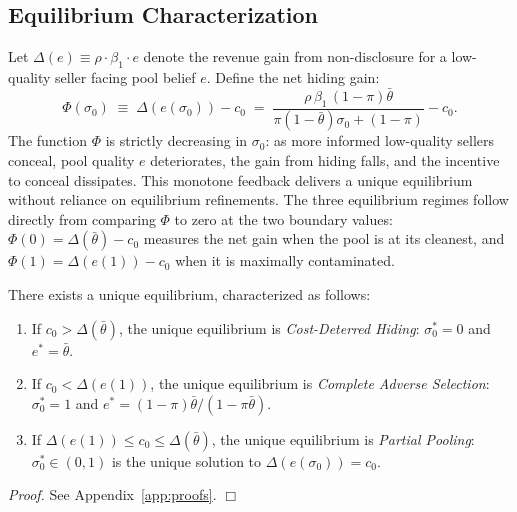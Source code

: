 \documentclass[10pt,letterpaper]{bp-template-concise}
\begin{document}
\subsection{Equilibrium Characterization}

Let $\Delta(e)\equiv\rho\cdot\beta_1\cdot e$ denote the revenue gain from non-disclosure for a low-quality seller facing pool belief $e$. Define the net hiding gain:
\begin{equation}
    \Phi(\sigma_0) \;\equiv\; \Delta\!\left(e(\sigma_0)\right) - c_0 \;=\; \frac{\rho\,\beta_1\,(1-\pi)\bar{\theta}}{\pi(1-\bar{\theta})\sigma_0 + (1-\pi)} - c_0.
    \label{eq:Phi}
\end{equation}
The function $\Phi$ is strictly decreasing in $\sigma_0$: as more informed low-quality sellers conceal, pool quality $e$ deteriorates, the gain from hiding falls, and the incentive to conceal dissipates. This monotone feedback delivers a unique equilibrium without reliance on equilibrium refinements. The three equilibrium regimes follow directly from comparing $\Phi$ to zero at the two boundary values: $\Phi(0)=\Delta(\bar{\theta})-c_0$ measures the net gain when the pool is at its cleanest, and $\Phi(1)=\Delta(e(1))-c_0$ when it is maximally contaminated.

\begin{proposition}
\label{prop:equilibrium}
There exists a unique equilibrium, characterized as follows:
\begin{enumerate}[label=(\roman*)]
    \item If $c_0>\Delta(\bar{\theta})$, the unique equilibrium is \emph{Cost-Deterred Hiding}: $\sigma_0^*=0$ and $e^*=\bar{\theta}$.
    \item If $c_0<\Delta(e(1))$, the unique equilibrium is \emph{Complete Adverse Selection}: $\sigma_0^*=1$ and $e^*=(1-\pi)\bar{\theta}/(1-\pi\bar{\theta})$.
    \item If $\Delta(e(1))\leq c_0\leq\Delta(\bar{\theta})$, the unique equilibrium is \emph{Partial Pooling}: $\sigma_0^*\in(0,1)$ is the unique solution to $\Delta(e(\sigma_0))=c_0$.
\end{enumerate}
\end{proposition}

\noindent\textit{Proof.} See Appendix~\ref{app:proofs}. $\Box$
\end{document}

